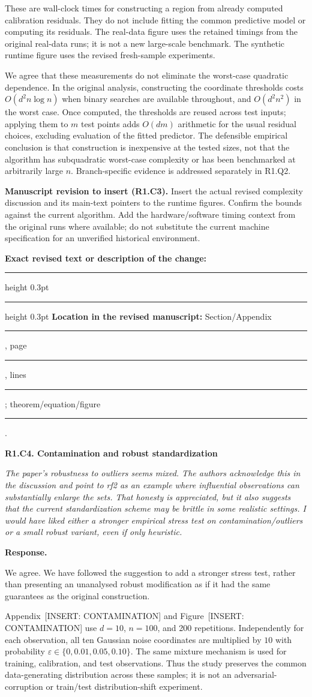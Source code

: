 \documentclass[11pt]{article}
\numberwithin{equation}{section}
\newcommand{\pending}[1]{\textcolor{AuthorRed}{[INSERT: #1]}}
\newcommand{\reviewercomment}[2]{%
  \par\medskip\noindent\textbf{#1}\par\nopagebreak
  \begingroup\color{ReviewerBlue}\itshape #2\par\endgroup
  \noindent\textbf{Response.} }
\newcommand{\revisionblock}[2]{%
  \par\begingroup\color{AuthorRed}\small
  \textbf{Manuscript revision to insert (#1).} #2\par
  \textbf{Exact revised text or description of the change:}\par
  \vspace{0.35em}\hrule height 0.3pt\vspace{1.4em}
  \hrule height 0.3pt\vspace{0.6em}
  \textbf{Location in the revised manuscript:}
  Section/Appendix \rule{1.3cm}{0.3pt},
  page \rule{1cm}{0.3pt},
  lines \rule{1.3cm}{0.3pt};
  theorem/equation/figure \rule{1.4cm}{0.3pt}.
  \par\endgroup}
\newcommand{\AppContamination}{Appendix~\pending{CONTAMINATION}} %
\newcommand{\FigContamination}{Figure~\pending{CONTAMINATION}} %
\begin{document}
These are wall-clock times for constructing a region from already
computed calibration residuals. They do not include fitting the common
predictive model or computing its residuals. The real-data figure uses
the retained timings from the original real-data runs; it is not a new
large-scale benchmark. The synthetic runtime figure uses the revised
fresh-sample experiments.

We agree that these measurements do not eliminate the worst-case
quadratic dependence. In the original analysis, constructing the
coordinate thresholds costs $O(d^2n\log n)$ when binary searches are
available throughout, and $O(d^2n^2)$ in the worst case. Once computed,
the thresholds are reused across test inputs; applying them to $m$
test points adds $O(dm)$ arithmetic for the usual residual choices,
excluding evaluation of the fitted predictor. The defensible empirical
conclusion is that construction is inexpensive at the tested sizes,
not that the algorithm has subquadratic worst-case complexity or has
been benchmarked at arbitrarily large $n$. Branch-specific evidence is
addressed separately in R1.Q2.

\revisionblock{R1.C3}{Insert the actual revised complexity discussion
and its main-text pointers to the runtime figures. Confirm the bounds
against the current algorithm. Add the hardware/software timing context
from the original runs where available; do not substitute the current
machine specification for an unverified historical environment.}

\reviewercomment{R1.C4. Contamination and robust standardization}{%
The paper's robustness to outliers seems mixed. The authors acknowledge
this in the discussion and point to rf2 as an example where influential
observations can substantially enlarge the sets. That honesty is
appreciated, but it also suggests that the current standardization
scheme may be brittle in some realistic settings. I would have liked
either a stronger empirical stress test on contamination/outliers or a
small robust variant, even if only heuristic.}

We agree. We have followed the suggestion to add a stronger stress test,
rather than presenting an unanalysed robust modification as if it had
the same guarantees as the original construction.

\AppContamination{} and \FigContamination{} use $d=10$, $n=100$, and
200 repetitions. Independently for each observation, all ten Gaussian
noise coordinates are multiplied by $10$ with probability
$\varepsilon\in\{0,0.01,0.05,0.10\}$. The same mixture mechanism is
used for training, calibration, and test observations. Thus the study
preserves the common data-generating distribution across these samples;
it is not an adversarial-corruption or train/test distribution-shift
experiment.
\end{document}
